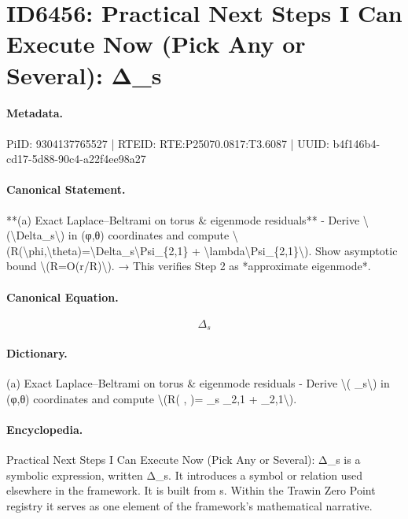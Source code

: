 \section*{ID6456: Practical Next Steps I Can Execute Now (Pick Any or Several): Δ\_s}
\paragraph{Metadata.}
PiID: 9304137765527 | RTEID: RTE:P25070.0817:T3.6087 | UUID: b4f146b4-cd17-5d88-90c4-a22f4ee98a27

\paragraph{Canonical Statement.}
**(a) Exact Laplace–Beltrami on torus \& eigenmode residuals** - Derive \textbackslash{}(\textbackslash{}Delta\_s\textbackslash{}) in (φ,θ) coordinates and compute \textbackslash{}(R(\textbackslash{}phi,\textbackslash{}theta)=\textbackslash{}Delta\_s\textbackslash{}Psi\_\{2,1\} + \textbackslash{}lambda\textbackslash{}Psi\_\{2,1\}\textbackslash{}). Show asymptotic bound \textbackslash{}(R=O(r/R)\textbackslash{}). → This verifies Step 2 as *approximate eigenmode*.

\paragraph{Canonical Equation.}
\[
\Delta_s
\]

\paragraph{Dictionary.}
(a) Exact Laplace–Beltrami on torus \& eigenmode residuals - Derive \textbackslash{}( \_s\textbackslash{}) in (φ,θ) coordinates and compute \textbackslash{}(R( , )= \_s \_2,1 + \_2,1\textbackslash{}).

\paragraph{Encyclopedia.}
Practical Next Steps I Can Execute Now (Pick Any or Several): Δ\_s is a symbolic expression, written Δ\_s. It introduces a symbol or relation used elsewhere in the framework. It is built from s. Within the Trawin Zero Point registry it serves as one element of the framework's mathematical narrative.
